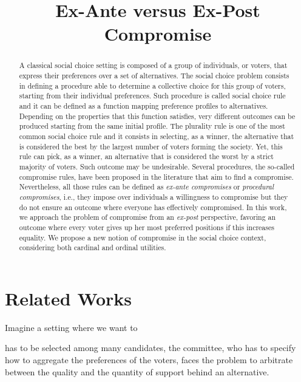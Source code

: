 \documentclass[version=3.21, pagesize, notitlepage, twoside=off, bibliography=totoc, DIV=calc, fontsize=12pt, a4paper]{scrartcl}
\title{Ex-Ante versus Ex-Post \\ Compromise}
\author{}
\date{}
\begin{document}
\maketitle
\thispagestyle{empty}

\begin{abstract}
	A classical social choice setting is composed of a group of individuals, or voters, that express their preferences over a set of alternatives. The social choice problem consists in defining a procedure able to determine a collective choice for this group of voters, starting from their individual preferences. Such procedure is called social choice rule and it can be defined as a function mapping preference profiles to alternatives. Depending on the properties that this function satisfies, very different outcomes can be produced starting from the same initial profile. The plurality rule is one of the most common social choice rule and it consists in selecting, as a winner, the alternative that is considered the best by the largest number of voters forming the society. Yet, this rule can pick, as a winner, an alternative that is considered the worst by a strict majority of voters. Such outcome may be undesirable. Several procedures, the so-called compromise rules, have been proposed in the literature that aim to find a compromise. Nevertheless, all those rules can be defined as \textit{ex-ante compromises} or \textit{procedural compromises}, i.e., they impose over individuals a willingness to compromise but they do not ensure an outcome where everyone has effectively compromised. In this work, we approach the problem of compromise from an \textit{ex-post} perspective, favoring an outcome where every voter gives up her most preferred positions if this increases equality. We propose a new notion of compromise in the social choice context, considering both cardinal and ordinal utilities. 
\end{abstract}

\pagebreak

\section{Related Works}
	
	
	Imagine a setting where we want to 
	
	has to be selected among many candidates, the committee, who has to specify how to aggregate the preferences of the voters, faces the problem to arbitrate between the quality and the quantity of support behind an alternative.
	
\end{document}
